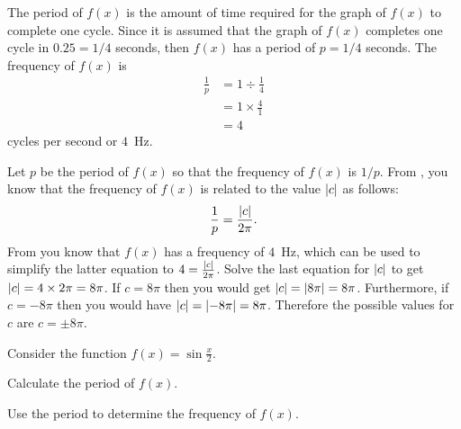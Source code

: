\documentclass[a4paper,oneside,12pt]{article}
\begin{document}
\begin{solution}
The period of $f(x)$ is the amount of time required for the graph of
$f(x)$ to complete one cycle.  Since it is assumed that the graph of
$f(x)$ completes one cycle in $0.25 = 1/4$ seconds, then $f(x)$ has a
period of $p = 1/4$ seconds.  The frequency of $f(x)$ is
\begin{align*}
\frac{1}{p}
&=
1 \div \frac{1}{4} \\[4pt]
&=
1 \times \frac{4}{1} \\[4pt]
&=
4
\end{align*}
cycles per second or $4$~Hz.

Let $p$ be the period of $f(x)$ so that the frequency of $f(x)$ is
$1 / p$.  From , you
know that the frequency of $f(x)$ is related to the value
$\lvert c\rvert$ as follows:
\[
\frac{1}{p}
=
\frac{\lvert c\rvert}{2\pi}.
\]
From  you
know that $f(x)$ has a frequency of $4$~Hz, which can be used to
simplify the latter equation to $4 = \frac{\lvert c\rvert}{2\pi}$.
Solve the last equation for $\lvert c\rvert$ to get
$\lvert c\rvert = 4 \times 2\pi = 8\pi$.  If $c = 8\pi$ then you
would get $\lvert c\rvert = \lvert8\pi\rvert = 8\pi$.
Furthermore, if $c = -8\pi$ then you would have
$\lvert c\rvert = \lvert-8\pi\rvert = 8\pi$.  Therefore the
possible values for $c$ are $c = \pm 8\pi$.
\end{solution}

\begin{exercise}
Consider the function $f(x) = \sin \frac{x}{2}$.
\begin{packedenum}
\item\label{subeg:trigonometric:sin_half_period}
  Calculate the period of $f(x)$.

\item\label{subeg:trigonometric:sin_half_frequency}
  Use the period to determine the frequency of $f(x)$.
\end{packedenum}
\end{exercise}

\end{document}
